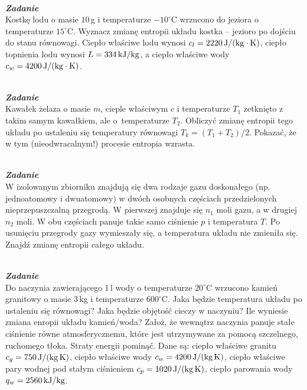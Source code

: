 \documentclass[11pt,a4paper]{article}
\newcounter{zadanie}\newcommand{\zadanie}[1][]{\addtocounter{zadanie}{1} ~\\  {\bf \emph{Zadanie \arabic{zadanie} #1 }} \\}
\begin{document}
\zadanie
Kostkę lodu o masie $10\,$g i temperaturze $-10^\circ$C wrzucono do jeziora o
temperaturze $15^\circ$C.
Wyznacz zmianę entropii układu kostka -- jezioro po dojściu do
stanu równowagi. Ciepło właściwe lodu wynosi $c_l = 2220\,{\rm J/(kg\cdot K)}$,
ciepło topnienia lodu wynosi $L = 334\,{\rm kJ/kg}$, a ciepło właściwe
wody $c_w = 4200\,{\rm J/(kg\cdot K)}$.
\newline




\zadanie
Kawałek żelaza o masie $m$, cieple właściwym $c$ i temperaturze $T_1$ zetknięto
z takim samym kawałkiem, ale o~temperaturze $T_2$.
Obliczyć zmianę entropii tego układu po ustaleniu się temperatury
równowagi \mbox{$T_k = (T_1+T_2)/2$}. Pokazać, że w tym (nieodwracalnym!)
procesie entropia wzrasta.
\newline



\zadanie
W izolowanym zbiorniku znajdują się dwa rodzaje gazu doskonałego (np. jednoatomowy i dwuatomowy)
w dwóch osobnych częściach przedzielonych nieprzepuszczalną przegrodą.
W pierwszej znajduje się $n_1$ moli gazu, a w drugiej $n_2$ moli.
W obu częściach panuje takie samo ciśnienie $p$ i temperatura $T$.
Po usunięciu przegrody gazy wymieszały się, a temperatura układu nie zmieniła się.
Znajdź zmianę entropii całego układu.
\newline

\zadanie
Do naczynia zawierającego 1\,l wody o temperaturze $20^\circ$C wrzucono kamień granitowy
o masie 3\,kg i temperaturze $600^\circ$C. Jaka będzie temperatura układu
po ustaleniu się równowagi? Jaka będzie objętość cieczy w naczyniu?
Ile wyniesie zmiana enropii  układu kamień/woda?
Założ, że wewnątrz naczynia panuje stałe ciśnienie równe
atmosferycznemu, które jest utrzymywane za pomocą szczelnego, ruchomego tłoka.
Straty energii pominąć.
Dane są:
ciepło właściwe granitu $c_g = 750\,{\rm J/(kg\, K)}$,
ciepło właściwe wody $c_w = 4200\,{\rm J/(kg\, K)}$,
ciepło właściwe pary wodnej pod stałym ciśnieniem $c_p = 1020\,{\rm J/(kg\, K)}$,
ciepło parowania wody $q_w = 2560\,{\rm kJ/kg}$.
\newline
\end{document}
